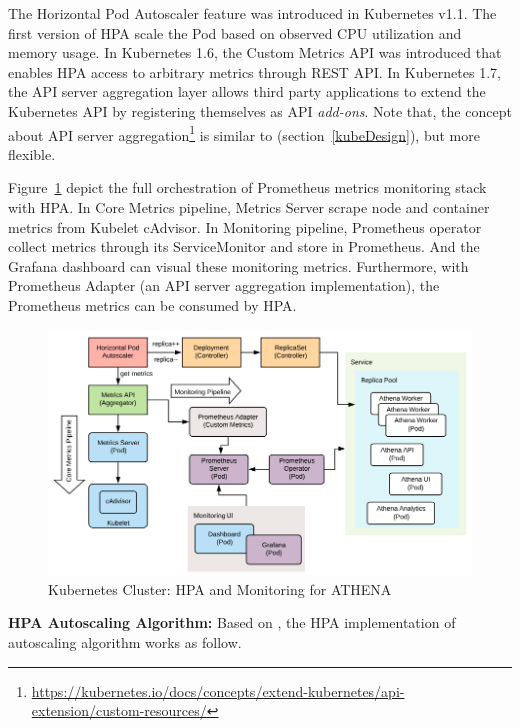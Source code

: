 The Horizontal Pod Autoscaler feature was introduced in Kubernetes v1.1. The first version of HPA scale the Pod based on observed CPU utilization and memory usage. In Kubernetes 1.6, the Custom Metrics API was introduced that enables HPA access to arbitrary metrics through REST API. In Kubernetes 1.7, the API server aggregation layer allows third party applications to extend the Kubernetes API by registering themselves as API \emph{add-ons}. Note that, the concept about API server aggregation\footnote{\url{https://kubernetes.io/docs/concepts/extend-kubernetes/api-extension/custom-resources/}} is similar to  (section~\ref{kubeDesign}), but more flexible. 

Figure~\ref{fig:kubeMonitAthena} depict the full orchestration of Prometheus metrics monitoring stack with HPA. In Core Metrics pipeline, Metrics Server scrape node and container metrics from Kubelet cAdvisor. In Monitoring pipeline, Prometheus operator collect metrics through its ServiceMonitor and store in Prometheus. And the Grafana dashboard can visual these monitoring metrics. Furthermore, with Prometheus Adapter (an API server aggregation implementation), the Prometheus metrics can be consumed by HPA.

\begin{figure}[H]
\centering
\includegraphics[width=0.7\paperwidth]{Figures/KUBE_monitoring}
\decoRule
\caption[Kubernetes Cluster: HPA and Monitoring for ATHENA]{Kubernetes Cluster: HPA and Monitoring for ATHENA}
\label{fig:kubeMonitAthena}
\end{figure}

\noindent \textbf{HPA Autoscaling Algorithm:} \quad Based on \parencite{kubeDoc}, the HPA implementation of autoscaling algorithm works as follow.

